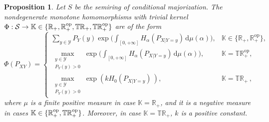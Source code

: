 \documentclass[aps,pra,11pt,onecolumn,nofootinbib,tightenlines]{revtex4-2}
\newtheorem{proposition}[theorem]{Proposition}
\theoremstyle{definition}
\newcommand{\R}{\mathbb{R}}
\newcommand{\T}{\mathbb{T}}
\newcommand{\mc}[1]{\mathcal{#1}}
\newcommand{\mb}[1]{\mathbb{#1}}
\begin{document}
\begin{proposition}
\label{prop: monotone homomorphisms}
Let \(S\) be the semiring of conditional majorization. The nondegenerate
monotone homomorphisms with trivial kernel
$\Phi:\mc S\to\mb K\in\{\R_+,\R_+^{\rm op},\T\R_+,\T\R_+^{\rm op}\}$ are of the form
\begin{equation}
\label{eq:FinalForm}
\Phi(P_{XY}) =
\begin{cases}
\displaystyle \sum_{y \in \mathcal{Y}} P_Y(y) \exp\Bigg(\int_{[0,+\infty]} H_\alpha(P_{X|Y=y}) \, \mathrm{d}\mu(\alpha) \Bigg), & \mb K\in\{\mathbb{R}_+,\mathbb{R}_+^{\mathrm{op}}\}, \\
\displaystyle \max \limits_{\substack{y \in \mathcal{Y} \\ P_Y( y) > 0}} \exp\Bigg(\int_{[0,+\infty]} H_\alpha(P_{X|Y=y}) \, \mathrm{d}\mu(\alpha) \Bigg), &\mb K=\mathbb{TR}_+^{\mathrm{op}}, \\
\displaystyle \max \limits_{\substack{y \in \mathcal{Y} \\ P_Y( y) > 0}} \exp\left(k H_0(P_{X|Y=y}) \, \right), &\mb K=\mathbb{TR}_+ \,,
\end{cases}
\end{equation}
where $\mu$ is a finite positive measure in case $\mb K=\mathbb{R}_+$, and it is a negative measure in cases $\mb K\in\{\mathbb{R}_+^{\mathrm{op}},\T\R_+^{\rm op}\}$. Moreover, in case $\mb K=\mathbb{TR}_+$,  $k$ is a positive constant.
\end{proposition}
\end{document}
